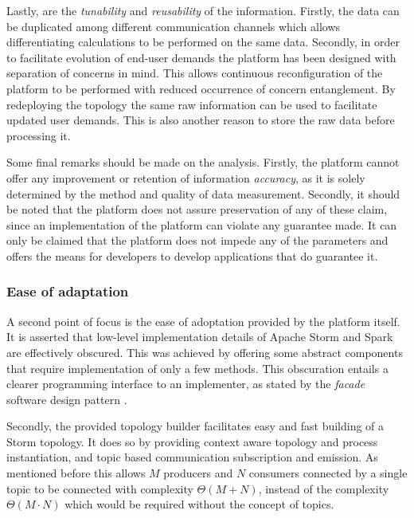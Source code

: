 Lastly, are the \emph{tunability} and \emph{reusability} of the information. Firstly, the data can be duplicated among different communication channels which allows differentiating calculations to be performed on the same data. Secondly, in order to facilitate evolution of end-user demands the platform has been designed with separation of concerns in mind. This allows continuous reconfiguration of the platform to be performed with reduced occurrence of concern entanglement. By redeploying the topology the same raw information can be used to facilitate updated user demands. This is also another reason to store the raw data before processing it. 

Some final remarks should be made on the analysis. Firstly, the platform cannot offer any improvement or retention of information \emph{accuracy}, as it is solely determined by the method and quality of data measurement. Secondly, it should be noted that the platform does not assure preservation of any of these claim, since an implementation of the platform can violate any guarantee made. It can only be claimed that the platform does not impede any of the parameters and offers the means for developers to develop applications that do guarantee it.

\subsubsection*{Ease of adaptation}
A second point of focus is the ease of adoptation provided by the platform itself. It is asserted that low-level implementation details of Apache Storm and Spark are effectively obscured. This was achieved by offering some abstract components that require implementation of only a few methods. This obscuration entails a clearer programming interface to an implementer, as stated by the \emph{facade} software design pattern \cite{facade_pattern}. 

Secondly, the provided topology builder facilitates easy and fast building of a Storm topology. It does so by providing context aware topology and process instantiation, and topic based communication subscription and emission.  As mentioned before this allows $M$ producers and $N$ consumers connected by a single topic to be connected with complexity $\Theta(M+N)$, instead of the complexity $\Theta(M\cdot N)$ which would be required without the concept of topics.


